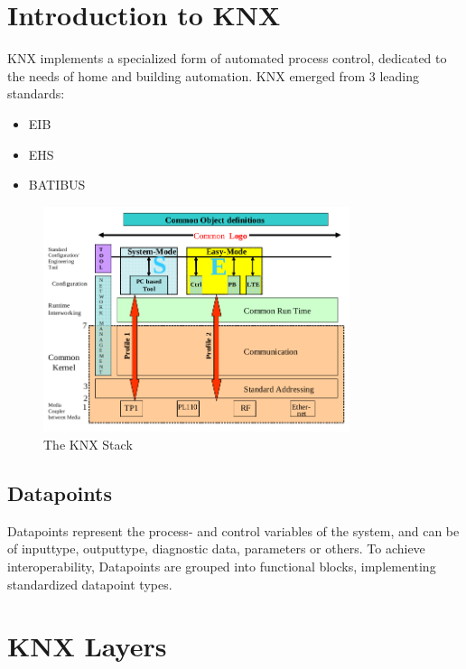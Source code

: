 
\section{Introduction to KNX}

KNX implements a specialized form of automated process control, dedicated to the needs of home
and building automation. KNX emerged from 3 leading standards:

\begin{itemize}
 \item EIB
 \item EHS
 \item BATIBUS
\end{itemize}


\begin{figure}
    \centering
    \includegraphics[width=0.8\textwidth]{figures/knx stack.png}
    \caption{The KNX Stack}
    \label{fig:knx_stack}
\end{figure}

\subsection{Datapoints}

Datapoints represent the process- and control variables of the system, and can be of
inputtype, outputtype, diagnostic data, parameters or others. To achieve interoperability,
Datapoints are grouped into functional blocks, implementing standardized datapoint types.

\section{KNX Layers}

